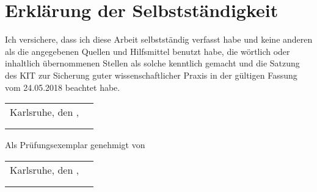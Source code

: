 \chapter*{Erklärung der Selbstständigkeit}
Ich versichere, dass ich diese Arbeit selbstständig verfasst habe und keine %
anderen als die angegebenen Quellen und Hilfsmittel benutzt habe, die %
wörtlich oder inhaltlich übernommenen Stellen als solche kenntlich gemacht und %
die Satzung des KIT zur Sicherung guter wissenschaftlicher Praxis in der %
gültigen Fassung vom 24.05.2018 beachtet habe.\\

\vspace{1cm}

\renewcommand{\arraystretch}{0} %

\begin{flushright}
	\begin{tabular}{rr}
		Karlsruhe, den \thesistimehandin, & \hspace*{5cm}\\[0mm]
		\cline{2-2}\\[2mm]    %
		& \thesisauthor       %
	\end{tabular}
\end{flushright}

\vfill

\begin{flushright}
	Als Prüfungsexemplar genehmigt von\\
	\vspace{1cm}
	\begin{tabular}{rr}
		Karlsruhe, den \thesistimehandin, & \hspace*{5cm}\\[0mm]
		\cline{2-2}\\[2mm]    %
		& \thesisreviewerone  %
	\end{tabular}
\end{flushright}

\renewcommand{\arraystretch}{1}

\cleardoublepage
